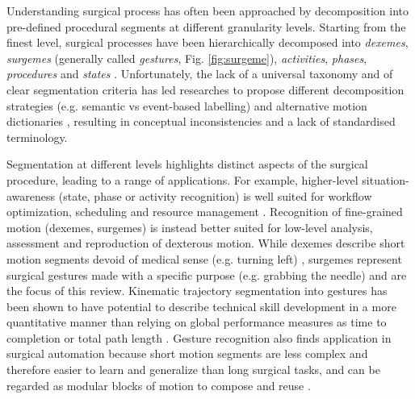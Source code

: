 \documentclass[journal]{IEEEtran}
\begin{document}
Understanding surgical process has often been approached by decomposition into pre-defined procedural segments at different granularity levels. 
Starting from the finest level, surgical processes have been hierarchically decomposed into \textit{dexemes}, \textit{surgemes} (generally called \textit{gestures}, Fig. \ref{fig:surgeme}), \textit{activities}, \textit{phases}, \textit{procedures} and \textit{states} \cite{Lalys2014, Dergachyova2017}. Unfortunately, the lack of a universal taxonomy and of clear segmentation criteria has led researches to propose different decomposition strategies (e.g. semantic \cite{Vedula2016} vs event-based \cite{Novi2012} labelling) and alternative motion dictionaries \cite{Gao2014, Vedula2016, Chen2018}, resulting in conceptual inconsistencies and a lack of standardised terminology.

Segmentation at different levels highlights distinct aspects of the surgical procedure, leading to a range of applications. For example, higher-level situation-awareness (state, phase or activity recognition) is well suited for workflow optimization, scheduling and resource management \cite{Maktabi2017}. 
Recognition of fine-grained motion (dexemes, surgemes) is instead better suited for low-level analysis, assessment and reproduction of dexterous motion. While dexemes describe short motion segments devoid of medical sense (e.g. turning left) \cite{Dergachyova2017}, surgemes represent surgical gestures made with a specific purpose (e.g. grabbing the needle) and are the focus of this review. 
Kinematic trajectory segmentation into gestures has been shown to have potential to describe technical skill development \cite{Gao2014, Vedula2016, Chen2018} in a more quantitative manner than relying on global performance measures as time to completion or total path length \cite{Judkins2009}. Gesture recognition also finds application in surgical automation because short motion segments are less complex and therefore easier to learn and generalize than long surgical tasks, and can be regarded as modular blocks of motion to compose and reuse \cite{Nagy2019}.
\end{document}

